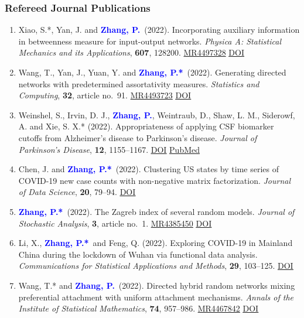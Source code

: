 \documentclass{res}
\def\MR#1{\href{http://www.ams.org/mathscinet-getitem?mr=#1}{MR#1}}
\newcommand{\PZ}{\textbf{\textcolor{blue}{Zhang, P.*}}}
\newcommand{\PZnot}{\textbf{\textcolor{blue}{Zhang, P.}}}
\begin{document}
\begin{resume}
\subsubsection{Refereed Journal Publications}
\begin{enumerate}
	
	\item {\sc Xiao, S.*, Yan, J.} and \PZnot\ (2022). 
	Incorporating auxiliary information in betweenness measure for
	input-output networks. {\em Physica A: Statistical Mechanics and its 
	Applications}, {\bf 607}, 128200. \MR{4497328} \href{https://doi.org/10.1016/j.physa.2022.128200}{\underline{DOI}}
	
	\item {\sc Wang, T., Yan, J., Yuan, Y.} and \PZ\ (2022). Generating 
	directed networks with predetermined assortativity measures. 
	{\em Statistics and Computing}, {\bf 32}, article no.\ 91. \MR{4493723}
	\href{https://doi.org/10.1007/s11222-022-10161-8}{\underline{DOI}}
	
	\item {\sc Weinshel, S., Irvin, D. J.,} \PZnot, {\sc Weintraub, 
	D., Shaw, L. M., Siderowf, A. and Xie, S. X.*} (2022). 
	Appropriateness of applying CSF biomarker cutoffs from 
	Alzheimer’s disease to Parkinson’s disease. {\em Journal of 
	Parkinson's Disease}, {\bf 12}, 1155--1167. 
	\href{https://doi.org/10.3233/JPD-212989}{\underline{DOI}} 
	\href{https://pubmed.ncbi.nlm.nih.gov/35431261}
	{\underline{PubMed}}
	
	\item {\sc Chen, J.} and \PZ\ (2022). Clustering US states by 
	time series of COVID-19 new case counts with non-negative matrix 
	factorization. {\em Journal of Data Science}, {\bf 20}, 79--94.
	\href{https://doi.org/10.6339/22-JDS1036}{\underline{DOI}}
	
	\item \PZ\ (2022). The Zagreb index of several random models. 
	{\em Journal of Stochastic Analysis}, {\bf 3}, article no.\ 1. \MR{4385450}
	\href{https://doi.org/10.31390/josa.3.1.01}{\underline{DOI}}
	
	\item {\sc Li, X.}, \PZ\ and {\sc Feng, Q.} (2022). Exploring 
	COVID-19 in Mainland China during the lockdown of Wuhan via 
	functional data analysis. {\em Communications for Statistical 
	Applications and Methods}, {\bf 29}, 103--125. 
	\href{https://doi.org/10.29220/CSAM.2022.29.1.103}
	{\underline{DOI}}
	
	\item {\sc Wang, T.*} and \PZnot\ (2022). Directed 
	hybrid random networks mixing preferential attachment with 
	uniform attachment mechanisms. {\em Annals of the Institute of 
	Statistical Mathematics}, {\bf 74}, 957--986. \MR{4467842}
	\href{https://doi.org/10.1007/s10463-022-00827-5}
	{\underline{DOI}}
	

\end{enumerate}
\end{resume}
\end{document}
